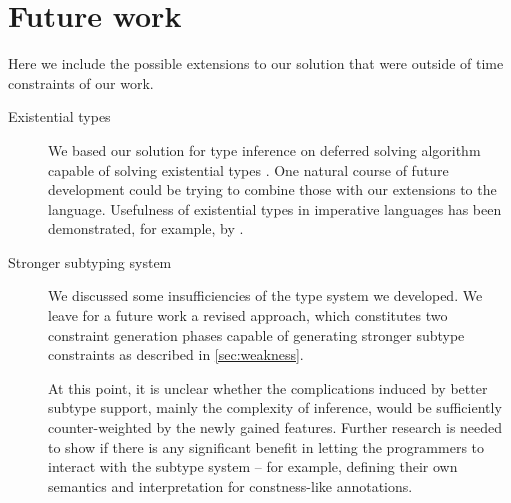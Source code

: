 

\section*{Future work}

Here we include the possible extensions to our solution that were outside of time constraints of our work.

\begin{description}
    \item[Existential types] We based our solution for type inference on deferred solving algorithm capable of solving existential types \cite{vytiniotis2011outsidein}. One natural course of future development could be trying to combine those with our extensions to the language. Usefulness of existential types in imperative languages has been demonstrated, for example, by \citet{grossman2002existential}.

    \item[Stronger subtyping system] We discussed some insufficiencies of the type system we developed. We leave for a future work a revised approach, which constitutes two constraint generation phases capable of generating stronger subtype constraints as described in \cref{sec:weakness}.

    At this point, it is unclear whether the complications induced by better subtype support, mainly the complexity of inference, would be sufficiently counter-weighted by the newly gained features. Further research is needed to show if there is any significant benefit in letting the programmers to interact with the subtype system -- for example, defining their own semantics and interpretation for constness-like annotations.
\end{description}
